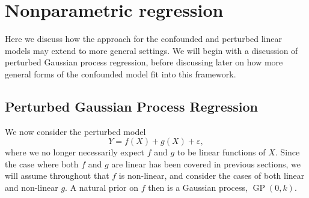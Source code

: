 \documentclass[11pt]{article}
\newcommand{\eps}{\varepsilon}
\numberwithin{equation}{section}
\begin{document}
\begin{table}
\centering
{}
\caption{Performance on the riboflavin dataset. Metrics are the mean over 100 MC replications for 100 randomly sampled coordinates.}
\label{Tab:riboflavin}
\end{table}


\section{Nonparametric regression}
Here we discuss how the approach for the confounded and perturbed linear models may extend to more general settings. We will begin with a discussion of perturbed Gaussian process regression, before discussing later on how more general forms of the confounded model fit into this framework.

\subsection{Perturbed Gaussian Process Regression}
We now consider the perturbed model
\begin{equation}
Y = f(X) + g(X) + \eps, \label{eq:pert_nonlinear_model}
\end{equation}	
where we no longer necessarily expect $f$ and $g$ to be linear functions of $X$. Since the case where both $f$ and $g$ are linear has been covered in previous sections, we will assume throughout that $f$ is non-linear, and consider the cases of both linear and non-linear $g$. A natural prior on $f$ then is a Gaussian process, $\operatorname{GP}(0, k)$.
\end{document}

